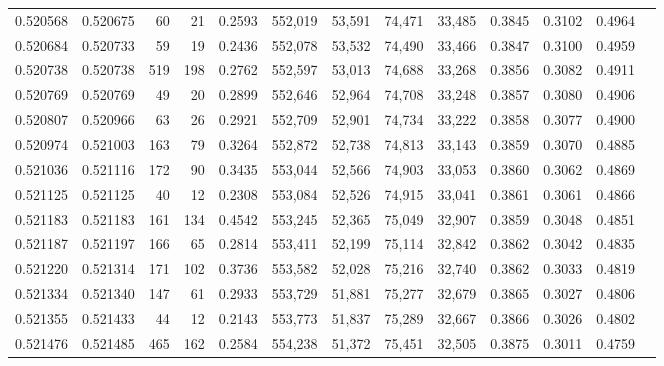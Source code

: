 \begin{tabular}{rrrrrrrrrrrrr}
0.520568 & 0.520675 &    60 &    21 &                                     0.2593 & 552,019 &  53,591 &  74,471 &  33,485 & 0.3845 & 0.3102 & 0.4964 \\
0.520684 & 0.520733 &    59 &    19 &                                     0.2436 & 552,078 &  53,532 &  74,490 &  33,466 & 0.3847 & 0.3100 & 0.4959 \\
0.520738 & 0.520738 &   519 &   198 &                                     0.2762 & 552,597 &  53,013 &  74,688 &  33,268 & 0.3856 & 0.3082 & 0.4911 \\
0.520769 & 0.520769 &    49 &    20 &                                     0.2899 & 552,646 &  52,964 &  74,708 &  33,248 & 0.3857 & 0.3080 & 0.4906 \\
0.520807 & 0.520966 &    63 &    26 &                                     0.2921 & 552,709 &  52,901 &  74,734 &  33,222 & 0.3858 & 0.3077 & 0.4900 \\
0.520974 & 0.521003 &   163 &    79 &                                     0.3264 & 552,872 &  52,738 &  74,813 &  33,143 & 0.3859 & 0.3070 & 0.4885 \\
0.521036 & 0.521116 &   172 &    90 &                                     0.3435 & 553,044 &  52,566 &  74,903 &  33,053 & 0.3860 & 0.3062 & 0.4869 \\
0.521125 & 0.521125 &    40 &    12 &                                     0.2308 & 553,084 &  52,526 &  74,915 &  33,041 & 0.3861 & 0.3061 & 0.4866 \\
0.521183 & 0.521183 &   161 &   134 &                                     0.4542 & 553,245 &  52,365 &  75,049 &  32,907 & 0.3859 & 0.3048 & 0.4851 \\
0.521187 & 0.521197 &   166 &    65 &                                     0.2814 & 553,411 &  52,199 &  75,114 &  32,842 & 0.3862 & 0.3042 & 0.4835 \\
0.521220 & 0.521314 &   171 &   102 &                                     0.3736 & 553,582 &  52,028 &  75,216 &  32,740 & 0.3862 & 0.3033 & 0.4819 \\
0.521334 & 0.521340 &   147 &    61 &                                     0.2933 & 553,729 &  51,881 &  75,277 &  32,679 & 0.3865 & 0.3027 & 0.4806 \\
0.521355 & 0.521433 &    44 &    12 &                                     0.2143 & 553,773 &  51,837 &  75,289 &  32,667 & 0.3866 & 0.3026 & 0.4802 \\
0.521476 & 0.521485 &   465 &   162 &                                     0.2584 & 554,238 &  51,372 &  75,451 &  32,505 & 0.3875 & 0.3011 & 0.4759 \\

\end{tabular}
